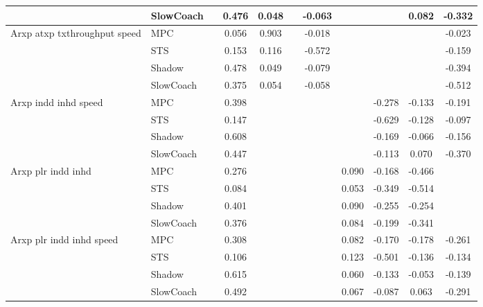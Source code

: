 \begin{tabular}{|l|l|*{9}{c|}}
                              & SlowCoach &       &     0.476 &     0.048 &     & -0.063 &     &      &   0.082 &   -0.332 \\
\midrule
Arxp atxp txthroughput speed    & MPC &       &     0.056 &     0.903 &     & -0.018 &     &      &      &   -0.023 \\
                              & STS &       &     0.153 &     0.116 &     & -0.572 &     &      &      &   -0.159 \\
                              & Shadow &       &     0.478 &     0.049 &     & -0.079 &     &      &      &   -0.394 \\
                              & SlowCoach &       &     0.375 &     0.054 &     & -0.058 &     &      &      &   -0.512 \\
\midrule
Arxp indd inhd speed    & MPC &       &     0.398 &        &     &     &     &  -0.278 &  -0.133 &   -0.191 \\
                              & STS &       &     0.147 &        &     &     &     &  -0.629 &  -0.128 &   -0.097 \\
                              & Shadow &       &     0.608 &        &     &     &     &  -0.169 &  -0.066 &   -0.156 \\
                              & SlowCoach &       &     0.447 &        &     &     &     &  -0.113 &   0.070 &   -0.370 \\
\midrule
Arxp plr indd inhd    & MPC &       &     0.276 &        &     &     &  0.090 &  -0.168 &  -0.466 &       \\
                              & STS &       &     0.084 &        &     &     &  0.053 &  -0.349 &  -0.514 &       \\
                              & Shadow &       &     0.401 &        &     &     &  0.090 &  -0.255 &  -0.254 &       \\
                              & SlowCoach &       &     0.376 &        &     &     &  0.084 &  -0.199 &  -0.341 &       \\
\midrule
Arxp plr indd inhd speed    & MPC &       &     0.308 &        &     &     &  0.082 &  -0.170 &  -0.178 &   -0.261 \\
                              & STS &       &     0.106 &        &     &     &  0.123 &  -0.501 &  -0.136 &   -0.134 \\
                              & Shadow &       &     0.615 &        &     &     &  0.060 &  -0.133 &  -0.053 &   -0.139 \\
                              & SlowCoach &       &     0.492 &        &     &     &  0.067 &  -0.087 &   0.063 &   -0.291 \\

\end{tabular}
